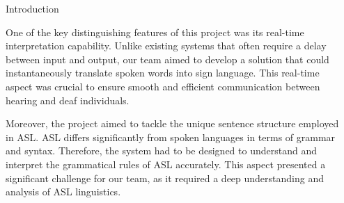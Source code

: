 \documentclass[final, 20pt]{beamer}
\newlength{\colwidth}
\newlength{\twocolwidth}
\begin{document}
\begin{frame}[t]
\begin{columns}[t]
\begin{column}{\twocolwidth}
\end{column}

\separatorcolumn

\begin{column}{\twocolwidth}
  \begin{block}{Introduction}
    \begin{multicols}{2}


      One of the key distinguishing features of this project was its real-time interpretation capability. Unlike existing systems that often require a delay between input and output, our team aimed to develop a solution that could instantaneously translate spoken words into sign language. This real-time aspect was crucial to ensure smooth and efficient communication between hearing and deaf individuals.

      Moreover, the project aimed to tackle the unique sentence structure employed in ASL. ASL differs significantly from spoken languages in terms of grammar and syntax. Therefore, the system had to be designed to understand and interpret the grammatical rules of ASL accurately. This aspect presented a significant challenge for our team, as it required a deep understanding and analysis of ASL linguistics.


\end{multicols}
\end{block}
\end{column}
\end{columns}
\end{frame}
\end{document}
